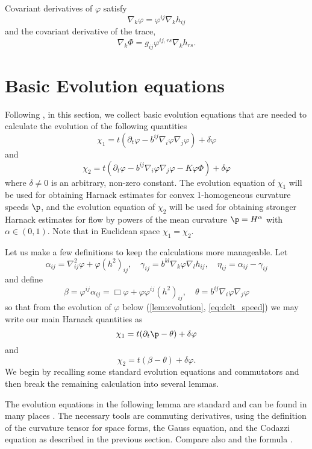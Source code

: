 \documentclass[12pt]{amsart}
\begin{document}
Covariant derivatives of \(\varphi\) satisfy
\begin{equation}
\label{eq:delphi}
\nabla_k \varphi = \varphi^{ij} \nabla_k h_{ij}
\end{equation}
and the covariant derivative of the trace,
\begin{equation}
\label{eq:delPhi}
\nabla_k \Phi = g_{ij} \varphi^{ij,rs} \nabla_k h_{rs}.
\end{equation}

\section{Basic Evolution equations}

Following \cite{MR1296393, MR1100812, MR1316556, MR1480081}, in this section, we collect basic evolution equations that are needed to calculate the evolution of the following quantities
\[
\chi_1 =t(\partial_t \varphi- b^{ij} \nabla_i \varphi \nabla_j \varphi) +\delta\varphi
\]
and
\[
\chi_2 =t(\partial_t \varphi - b^{ij} \nabla_i \varphi \nabla_j \varphi - K \varphi \Phi) +\delta\varphi
\]
where \(\delta \ne 0\) is an arbitrary, non-zero constant. The evolution equation of $\chi_1$ will be used for obtaining Harnack estimates for convex 1-homogeneous curvature speeds $\p$, and the evolution equation of $\chi_2$ will be used for obtaining stronger Harnack estimates for flow by powers of the mean curvature $\p=H^{\alpha}$ with $\alpha\in(0,1).$ Note that in Euclidean space $\chi_1=\chi_2.$

Let us make a few definitions to keep the calculations more manageable. Let
\[
\alpha_{ij} = \nabla^2_{ij} \varphi + \varphi(h^2)_{ij}, \quad \gamma_{ij} = b^{kl} \nabla_k \varphi \nabla_l h_{ij}, \quad \eta_{ij} = \alpha_{ij} - \gamma_{ij}
\]
and define
\[
\beta = \varphi^{ij} \alpha_{ij} = \Box\varphi + \varphi \varphi^{ij}(h^2)_{ij}, \quad \theta =  b^{ij} \nabla_i \varphi \nabla_j \varphi
\]
so that from the evolution of \(\varphi\) below (\cref{lem:evolution}, \cref{eq:delt_speed}) we may write our main Harnack quantities as
\[
\chi_1 = t(\partial_t\p- \theta) + \delta\varphi
\]
and
\[
\chi_2 = t(\beta - \theta) + \delta\varphi.
\]
We begin by recalling some standard evolution equations and commutators and then break the remaining calculation into several lemmas.

The evolution equations in the following lemma are standard and can be found in many places \cite{MR1296393, MR1100812, MR1316556, MR892052, MR1480081}. The necessary tools are commuting derivatives, using the definition of the curvature tensor for space forms, the Gauss equation, and the Codazzi equation as described in the previous section. Compare also \cite[p.~94-95]{Gerhardt:/2006} and the formula \cite[eq.~(6.17)]{Gerhardt:01/1996}.
\end{document}
